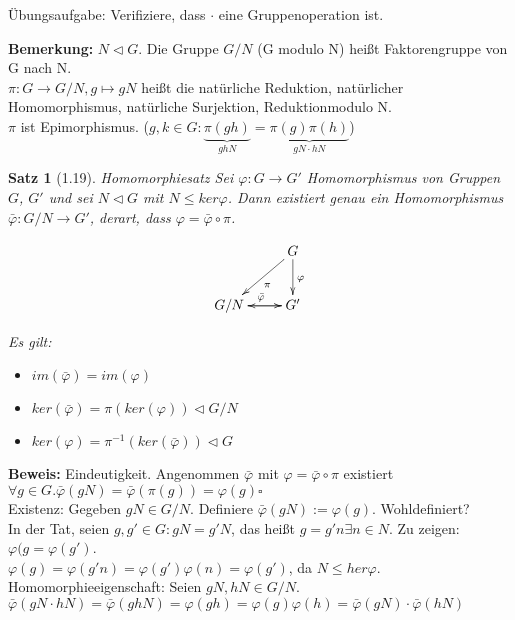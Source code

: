\documentclass[10pt,a4paper]{article}
\newtheorem{satz}{Satz}
\begin{document}
Übungsaufgabe: Verifiziere, dass $\cdot$ eine Gruppenoperation ist.

\textbf{Bemerkung:} $N \lhd G$. Die Gruppe $G/N$ (\glqq G modulo N\grqq ) heißt \glqq Faktorengruppe von G nach N\grqq .\\
$\pi : G \rightarrow G/N, g \mapsto gN$ heißt die \glqq natürliche Reduktion\grqq , \glqq natürlicher Homomorphismus\grqq , \glqq natürliche Surjektion\grqq , \glqq Reduktionmodulo N\grqq .\\
$\pi$ ist Epimorphismus. ($g,k \in G : \underbrace{\pi(gh)}_{gh N} = \underbrace{\pi(g) \pi(h)}_{gN \cdot hN}$)

\begin{satz}[1.19]{\glqq Homomorphiesatz\grqq}
 Sei $\varphi: G \rightarrow G'$ Homomorphismus von Gruppen $G$, $G'$ und sei $N \lhd G$ mit $N \leq ker \varphi$. Dann existiert \emph{genau ein} Homomorphismus $\bar{\varphi} : G/N \rightarrow G'$, derart, dass $\varphi = \bar{\varphi} \circ \pi$. 

\begin{displaymath}
    \xymatrix{          & G \ar[d]^{\varphi} \ar[dl]^{\pi} \\
                G / N \ar[r]^{\bar{\varphi}} & G' \ar[l] }
\end{displaymath} 
 
 Es gilt:
 \begin{itemize}
  \item $im(\bar{\varphi}) = im(\varphi)$
  \item $ker(\bar{\varphi}) = \pi(ker(\varphi)) \lhd G/N$
  \item $ker(\varphi) = \pi^{-1}(ker(\bar{\varphi})) \lhd G$
 \end{itemize}
\end{satz}
\textbf{Beweis:} Eindeutigkeit. Angenommen $\bar{\varphi}$ mit $\varphi = \bar{\varphi} \circ \pi$ existiert $\forall g \in G . \bar{\varphi}(gN) = \bar{\varphi}(\pi(g)) = \varphi(g) \square$\\
Existenz: Gegeben $gN \in G/N$. Definiere $\bar{\varphi}(gN) := \varphi(g)$. Wohldefiniert?\\
In der Tat, seien $g,g' \in G: gN = g'N$, das heißt $g=g'n \exists n \in N$. Zu zeigen: $\varphi(g = \varphi(g')$.\\
$\varphi(g) = \varphi(g'n) = \varphi(g') \varphi(n) = \varphi(g')$, da $N \leq her \varphi$.\\
\smallskip
Homomorphieeigenschaft: Seien $gN, hN \in G/N$.\\
$\bar{\varphi}(gN \cdot hN) = \bar{\varphi}(gh N) = \varphi(gh) = \varphi(g) \varphi(h) = \bar{\varphi}(gN) \cdot \bar{\varphi}(hN)$\\
\end{document}
